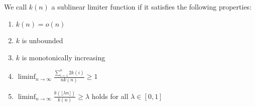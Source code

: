 \documentclass[11pt,a4paper]{article}
\numberwithin{equation}{section}
\begin{document}
\begin{definition} \label{def:sublinear}
We call $k(n)$ a sublinear limiter function if it satisfies the following properties:
\begin{enumerate}[label=(\arabic*)]
    \item $k(n) = o(n)$ \label{sublin2}
    
    \item $k$ is unbounded \label{sublin3}
    
    \item $k$ is monotonically increasing \label{sublin4}

    \item $\displaystyle\liminf_{n \to \infty} \frac{\sum_{i=1}^{n} 2k(i)}{ n k(n)} \geq 1$ \label{sublin1}

    \item $\displaystyle\liminf_{n \to \infty} \frac{k(\lfloor \lambda n\rfloor)}{k(n)} \geq \lambda$ holds for all $\lambda \in [0,1]$ \label{sublin5}
    
\end{enumerate}
\end{definition}
\end{document}
